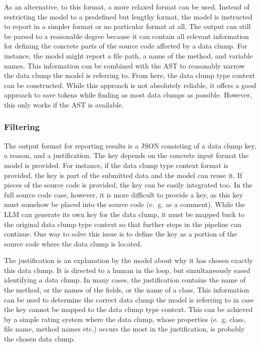 As an alternative, to this format, a more relaxed format can be used. Instead of restricting the model to a predefined but lengthy format, the model is instructed to report in a simpler format or no particular format at all. The output can still be parsed to a reasonable degree because it can contain all relevant information for defining the concrete parts of the source code affected by a data clump. For instance, the model might report a file path, a name of the method, and variable names. This information can be combined with the \ac{AST} to reasonably narrow the data clump the model is referring to. From here, the data clump type context can be constructed. While this approach is not absolutely reliable, it offers a good approach to save tokens while finding as most data clumps as possible. However, this only works if the \ac{AST} is available. 

\subsubsection{Filtering}\label{sec:output_format_filtering}
 The output format for reporting results is a \ac{JSON}  consisting of a data clump key, a reason, and a justification. The key depends on the concrete input format the model is provided. For instance, if the data clump type context format is provided, the key is part of the submitted data and the model can reuse it. If pieces of the source code is provided, the key can be easily integrated too. In the full source code case, however, it is more difficult to provide a key, as this key must somehow be placed into the source code (e.~g. as a comment). While the \ac{LLM} can generate its own key for the data clump, it must be mapped back to the original data clump type context so that further steps in the pipeline can continue. One way to solve this issue is to define the key as a portion of the source code where the data clump is located. 

 The justification is an explanation by the model about why it has chosen exactly this data clump. It is directed to a human in the loop, but simultaneously eased identifying a data clump. In many cases, the justification contains the name of the method, or the names of the fields, or the name of a class. This information can be used to determine the correct data clump the model is referring to in case the key cannot be mapped to the  data clump type context. This can be achieved by a simple rating system where the data clump, whose properties (e.~g. class, file name, method names etc.) occurs the most in the justification, is probably the chosen data clump. 

